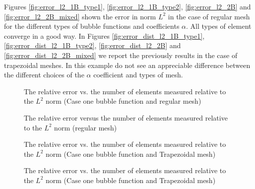 \documentclass[preprint,12pt,authoryear]{elsarticle}
\begin{document}
Figures \ref{fig:error_l2_1B_type1}, \ref{fig:error_l2_1B_type2}, \ref{fig:error_l2_2B} and \ref{fig:error_l2_2B_mixed} shown the error in norm $L^{2}$ in the case of regular mesh for the different types of bubble functions and coefficients $\alpha$. 
All types of element converge in a good way. 
In Figures  \ref{fig:error_dist_l2_1B_type1}, 
\ref{fig:error_dist_l2_1B_type2}, \ref{fig:error_dist_l2_2B} and \ref{fig:error_dist_l2_2B_mixed} we report the previously results in the case of trapezoidal meshes.
In this example do not see an appreciable difference between the different choices of the $\alpha$ coefficient and types of mesh.
\begin{figure}[h!]
\begin{center}
\caption{The relative error vs. the number of elements measured relative 
to the $L^{2}$ norm (Case one bubble function and regular mesh)}
\end{center}
\end{figure}
%
\begin{figure}[h!]
\begin{center}
\caption{The relative error versus the number of elements measured relative to the $L^{2}$ norm (regular mesh)}
\end{center}
\end{figure}
\begin{figure}[h!]
\begin{center}
\caption{The relative error vs. the number of elements measured relative 
to the $L^{2}$ norm (Case one bubble function and Trapezoidal mesh)}
\end{center}
\end{figure}
%
\begin{figure}[h!]
\begin{center}
\caption{The relative error vs. the number of elements measured relative 
to the $L^{2}$ norm (Case one bubble function and Trapezoidal mesh)}
\end{center}
\end{figure}
%
\end{document}
